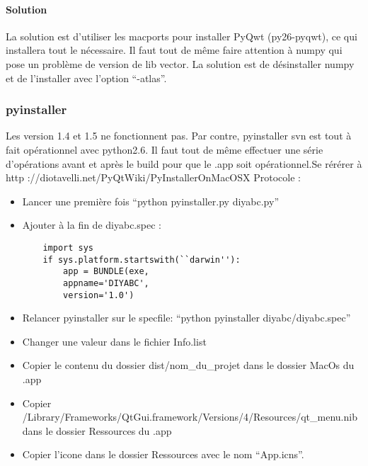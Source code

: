 \documentclass[12pt,a4paper]{article}
\begin{document}
        \paragraph{Solution}

        La solution est d'utiliser les macports pour installer PyQwt
        (py26-pyqwt), ce qui installera tout le n\'ecessaire. Il faut tout de
        même faire attention à numpy qui pose un problème de version de lib
        vector. La solution est de d\'esinstaller numpy et de l'installer avec
        l'option ``-atlas''. 
        
        \subsubsection{pyinstaller}

        Les version 1.4 et 1.5 ne fonctionnent pas. Par contre, pyinstaller svn
        est tout à fait op\'erationnel avec python2.6. Il faut tout de même
        effectuer une s\'erie d'op\'erations avant et après le build pour que le
        .app soit op\'erationnel.Se r\'er\'erer à \newline http
        ://diotavelli.net/PyQtWiki/PyInstallerOnMacOSX \newline
        Protocole : \\

        \label{mac_pyinstaller}
        \begin{itemize}
            \item Lancer une première fois ``python pyinstaller.py diyabc.py''
            \item Ajouter à la fin de diyabc.spec :
        \begin{verbatim}
    import sys 
    if sys.platform.startswith(``darwin''): 
        app = BUNDLE(exe, 
        appname='DIYABC', 
        version='1.0')
        \end{verbatim}
            \item Relancer pyinstaller sur le specfile: ``python pyinstaller diyabc/diyabc.spec''
            \item Changer une valeur dans le fichier Info.list
            \item Copier le contenu du dossier dist/nom\_du\_projet dans le dossier MacOs du .app
            \item Copier /Library/Frameworks/QtGui.framework/Versions/4/Resources/qt\_menu.nib dans le dossier Ressources du .app
            \item Copier l'icone dans le dossier Ressources avec le nom ``App.icns''.\\
        \end{itemize}
\end{document}

